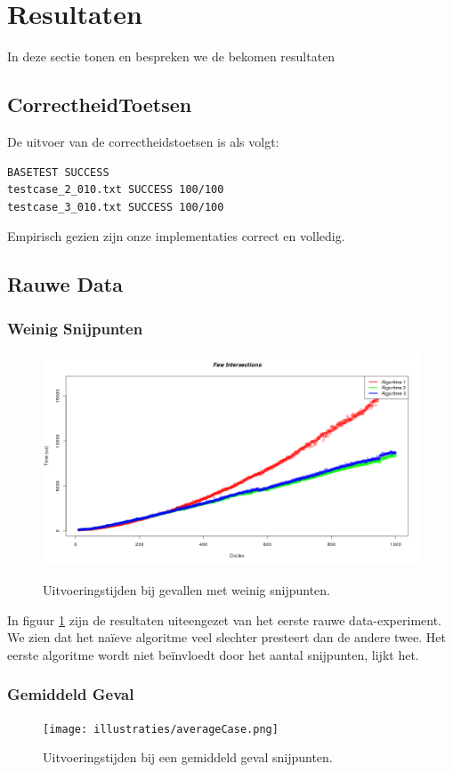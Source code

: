 \newpage
\section{Resultaten}
In deze sectie tonen en bespreken we de bekomen resultaten


\subsection{CorrectheidToetsen}
De uitvoer van de correctheidstoetsen is als volgt:
\begin{verbatim}
BASETEST SUCCESS
testcase_2_010.txt SUCCESS 100/100
testcase_3_010.txt SUCCESS 100/100
\end{verbatim}
Empirisch gezien zijn onze implementaties correct en volledig.

\subsection{Rauwe Data}
\subsubsection{Weinig Snijpunten}
\begin{figure}[H]
   	\centering
   	\includegraphics[width=\textwidth]{illustraties/fewIntersections.png}
  	\label{fig:few_intersections}
  	\caption{Uitvoeringstijden bij gevallen met weinig snijpunten.}
\end{figure}
In figuur \ref{fig:few_intersections} zijn de resultaten uiteengezet van het eerste rauwe data-experiment. We zien dat het na\"ieve algoritme veel slechter presteert dan de andere twee. Het eerste algoritme wordt niet be\"invloedt door het aantal snijpunten, lijkt het.

\subsubsection{Gemiddeld Geval}
\begin{figure}[H]
	\centering
   	\texttt{[image: illustraties/averageCase.png]}
  	\label{fig:average_case}
  	\caption{Uitvoeringstijden bij een gemiddeld geval snijpunten.}
\end{figure}
   
